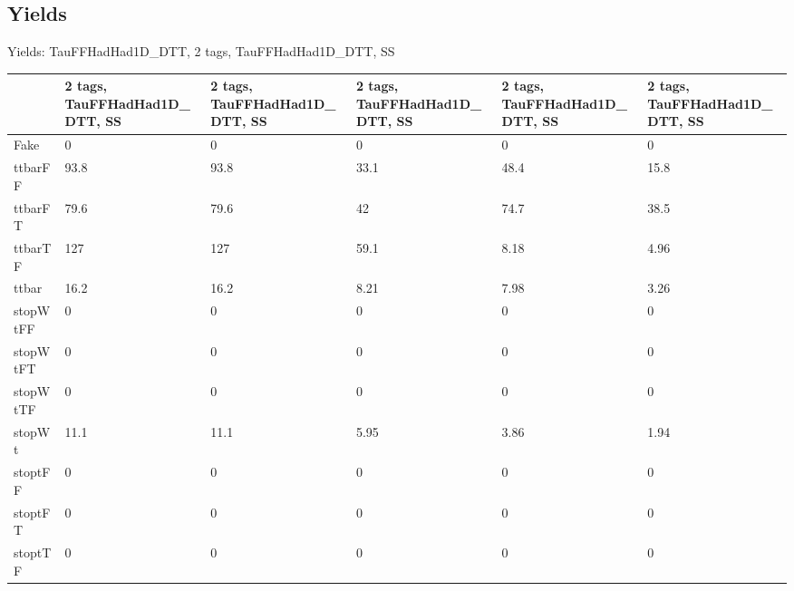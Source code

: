 
\subsection{Yields}

\begin{frame}{Yields: TauFFHadHad1D\_DTT, 2 tags, TauFFHadHad1D\_DTT, SS}
\begin{center}
  \begin{tabular}{l| >{\centering\let\newline\\\arraybackslash\hspace{0pt}}m{1.4cm}| >{\centering\let\newline\\\arraybackslash\hspace{0pt}}m{1.4cm}| >{\centering\let\newline\\\arraybackslash\hspace{0pt}}m{1.4cm}| >{\centering\let\newline\\\arraybackslash\hspace{0pt}}m{1.4cm}| >{\centering\let\newline\\\arraybackslash\hspace{0pt}}m{1.4cm}}
    & 2 tags, TauFFHadHad1D\_DTT, SS & 2 tags, TauFFHadHad1D\_DTT, SS & 2 tags, TauFFHadHad1D\_DTT, SS & 2 tags, TauFFHadHad1D\_DTT, SS & 2 tags, TauFFHadHad1D\_DTT, SS \\
 \hline \hline
    Fake& 0 & 0 & 0 & 0 & 0 \\
 \hline
    ttbarFF& 93.8 & 93.8 & 33.1 & 48.4 & 15.8 \\
 \hline
    ttbarFT& 79.6 & 79.6 & 42 & 74.7 & 38.5 \\
 \hline
    ttbarTF& 127 & 127 & 59.1 & 8.18 & 4.96 \\
 \hline
    ttbar& 16.2 & 16.2 & 8.21 & 7.98 & 3.26 \\
 \hline
    stopWtFF& 0 & 0 & 0 & 0 & 0 \\
 \hline
    stopWtFT& 0 & 0 & 0 & 0 & 0 \\
 \hline
    stopWtTF& 0 & 0 & 0 & 0 & 0 \\
 \hline
    stopWt& 11.1 & 11.1 & 5.95 & 3.86 & 1.94 \\
 \hline
    stoptFF& 0 & 0 & 0 & 0 & 0 \\
 \hline
    stoptFT& 0 & 0 & 0 & 0 & 0 \\
 \hline
    stoptTF& 0 & 0 & 0 & 0 & 0 \\

\end{tabular}
\end{center}
\end{frame}
